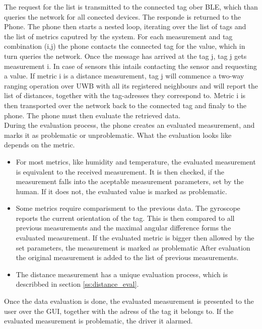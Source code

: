 The request for the list is transmitted to the connected tag ober BLE, which than queries the network for all conected devices.
The responde is returned to the Phone.
The phone then starts a nested loop, iterating over the list of tags and the list of metrics caputred by the system.
For each measurement and tag combination (i,j) the phone contacts the connected tag for the value, which in turn queries the network.
Once the message has arrived at the tag j, tag j gets measurement i. In case of sensors this intails contacting the sensor and requesting a value.
If metric i is a distance measurement, tag j will commence a two-way ranging operation over UWB with all its registered neighbours and will report the list of distances, together with the tag-adresses they correspond to.
Metric i is then transported over the network back to the connected tag and finaly to the phone.
The phone must then evaluate the retrieved data. \\
During the evaluation process, the phone creates an evaluated measurement, and marks it as problematic or unproblematic.
What the evaluation looks like depends on the metric.
\begin{itemize}
\item For most metrics, like humidity and temperature, the evaluated measurement is equivalent to the received measurement. It is then checked, if the measurement falls into the aceptable measurement parameters, set by the human.
If it does not, the evaluated value is marked as problematic.
\item Some metrics require comparisment to the previous data. The gyroscope reports the current orientation of the tag.
This is then compared to all previous measurements and the maximal angular difference forms the evaluated measurement.
If the evaluated metric is bigger then allowed by the set parameters, the measurement is marked as problematic
After evaluation the original measurement is added to the list of previous measurements.
\item The distance measurement has a unique evaluation process, which is describbed in section \ref{ss:distance_eval}.
\end{itemize}
Once the data evaluation is done, the evaluated measurement is presented to the user over the GUI, together with the adress of the tag it belongs to.
If the evaluated measurement is problematic, the driver it alarmed.


